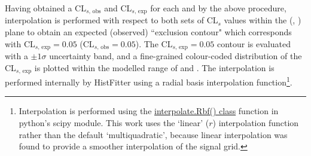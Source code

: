 Having obtained a CL\(_{s\text{, obs}}\) and CL\(_{s\text{, exp}}\) for each \ms and \mZp by the above procedure, interpolation is performed with respect to both sets of CL\(_s\) values within the (\ms, \mZp) plane to obtain an expected (observed) ``exclusion contour" which corresponds with CL\(_{s\text{, exp}}=0.05\) (CL\(_{s\text{, obs}}=0.05\)). The CL\(_{s\text{, exp}}=0.05\) contour is evaluated with a \(\pm1\sigma\) uncertainty band, and a fine-grained colour-coded distribution of the CL\(_{s\text{, exp}}\) is plotted within the modelled range of \ms and \mZp. The interpolation is performed internally by HistFitter using a radial basis interpolation function\footnote{Interpolation is performed using the \href{https://docs.scipy.org/doc/scipy/reference/generated/scipy.interpolate.Rbf.html}{interpolate.Rbf() class} function in python's scipy module. This work uses the `linear' (\(r\)) interpolation function rather than the default `multiquadratic', because linear interpolation was found to provide a smoother interpolation of the signal grid.}. 


